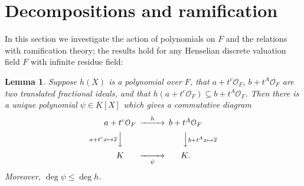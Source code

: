 \documentclass{lmsMODIFIED}
\newtheorem{lemma}[theorem]{Lemma}     %
\newcommand{\roi}{\mathcal{O}}
\newcommand{\res}[1]{\overline{#1}}
\begin{document}
\section{Decompositions and ramification}\label{section_decompositions_and_ramificiation}

In this section we investigate the action of polynomials on $F$ and the relations with ramification theory; the results hold for any Henselian discrete valuation field $F$ with infinite residue field:

\begin{lemma}
Suppose $h(X)$ is a polynomial over $F$, that $a+t^c\roi_{F}$, $b+t^A\roi_{F}$ are two translated fractional ideals, and that $h(a+t^c\roi_{F})\subseteq b+t^A\roi_{F}$. Then there is a unique polynomial $\psi\in K [X]$ which gives a commutative diagram
\[\begin{CD}
a+t^c\roi_{F} @>h>> b+t^A\roi_{F} \\
@V{a+t^c x\mapsto\res{x}}VV  @VV{b+t^Ax\mapsto\res{x}}V  \\
 K  @>>\psi>  K .\\
\end{CD}\]
Moreover, $\deg\psi\le\deg h$.
\end{lemma}
\end{document}
